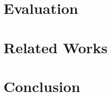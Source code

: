 \documentclass{article}
\begin{document}
\section{Evaluation}

\section{Related Works}

\section{Conclusion}
\end{document}

